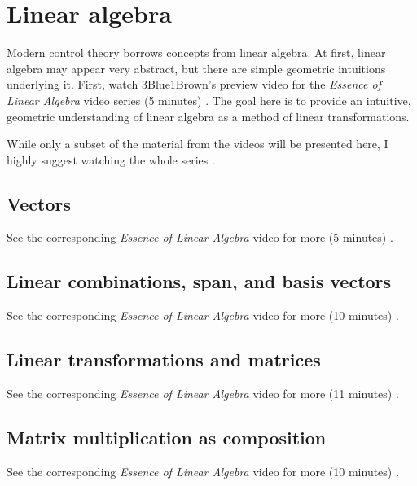 
\chapter{Linear algebra}

Modern control theory borrows concepts from linear algebra. At first, linear
algebra may appear very abstract, but there are simple geometric intuitions
underlying it. First, watch 3Blue1Brown's preview video for the
\textit{Essence of Linear Algebra} video series (5 minutes)
\cite{bib:linalg_preview}. The goal here is to provide an intuitive, geometric
understanding of linear algebra as a method of linear transformations.

While only a subset of the material from the videos will be presented here, I
highly suggest watching the whole series \cite{bib:essence_of_linalg}.

\section{Vectors}

See the corresponding \textit{Essence of Linear Algebra} video for more (5
minutes) \cite{bib:linalg_vectors}.

\section{Linear combinations, span, and basis vectors}

See the corresponding \textit{Essence of Linear Algebra} video for more (10
minutes) \cite{bib:linalg_linear_combinations}.

\section{Linear transformations and matrices}

See the corresponding \textit{Essence of Linear Algebra} video for more (11
minutes) \cite{bib:linalg_linear_transformations_and_matrices}.

\section{Matrix multiplication as composition}

See the corresponding \textit{Essence of Linear Algebra} video for more (10
minutes) \cite{bib:linalg_matrix_multiplication_as_composition}.

